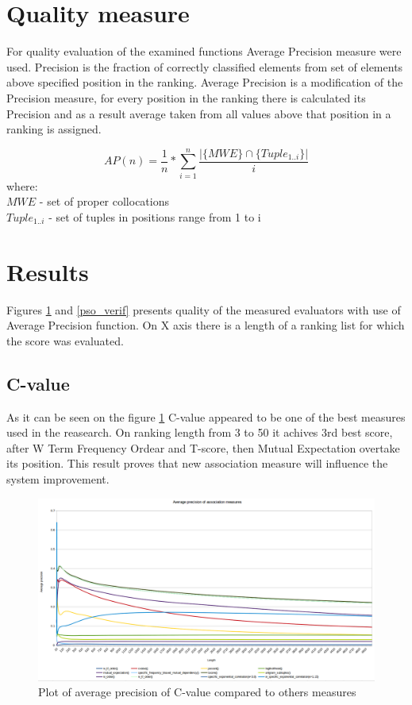 \section{Quality measure}
For quality evaluation of the examined functions Average Precision measure were used.
Precision is the fraction of correctly classified elements from set of elements above specified position in the ranking. 
Average Precision is a modification of the Precision measure, for every position in the ranking there is calculated its 
Precision and as a result average taken from all values above that position in a ranking is assigned.

\[
    AP(n) = \frac{1}{n} * \sum_{i=1}^{n}{\frac{|\{MWE\} \cap \{Tuple_{1..i}\}|}{i}}
\]
where: \\
\(MWE\) - set of proper collocations \\
\(Tuple_{1..i}\) - set of tuples in positions range from 1 to i

\section{Results}
Figures \ref{cval_verif} and \ref{pso_verif} presents quality of the measured evaluators with use of Average Precision function. 
On X axis there is a length of a ranking list for which the score was evaluated.
\subsection{C-value}
As it can be seen on the figure \ref{cval_verif} C-value appeared to be one of the best measures used in the reasearch. 
On ranking length from 3 to 50 it achives 3rd best score, after W Term Frequency Ordear and T-score, then Mutual Expectation 
overtake its position. This result proves that new association measure will influence the system improvement.
\begin{figure}[ht]
    \centering
    \includegraphics[scale=0.32]{img/cval_verif.png}
    \caption{Plot of average precision of C-value compared to others measures}
    \label{cval_verif}
\end{figure}

